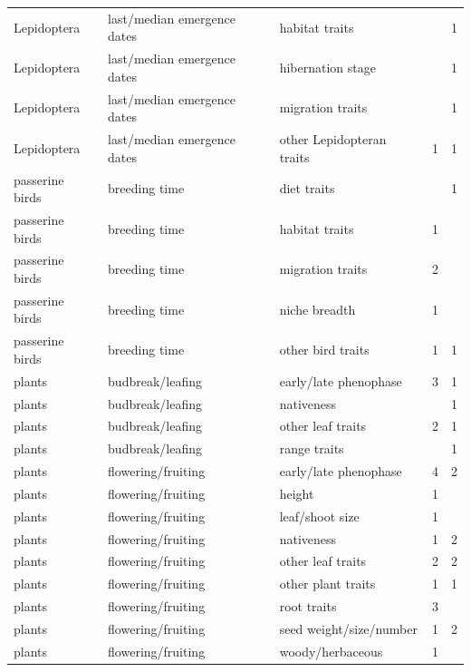 \documentclass[11pt,letter]{article}
\begin{document}
\begin{table}[ht]
\begin{tabular}{lllrr}
  Lepidoptera & last/median emergence dates & habitat traits &  &   1 \\ 
  Lepidoptera & last/median emergence dates & hibernation stage &  &   1 \\ 
  Lepidoptera & last/median emergence dates & migration traits &  &   1 \\ 
  Lepidoptera & last/median emergence dates & other Lepidopteran traits &   1 &   1 \\ 
  passerine birds & breeding time & diet traits &  &   1 \\ 
  passerine birds & breeding time & habitat traits &   1 &  \\ 
  passerine birds & breeding time & migration traits &   2 &  \\ 
  passerine birds & breeding time & niche breadth &   1 &  \\ 
  passerine birds & breeding time & other bird traits &   1 &   1 \\ 
  plants & budbreak/leafing & early/late phenophase &   3 &   1 \\ 
  plants & budbreak/leafing & nativeness &  &   1 \\ 
  plants & budbreak/leafing & other leaf traits &   2 &   1 \\ 
  plants & budbreak/leafing & range traits &  &   1 \\ 
  plants & flowering/fruiting & early/late phenophase &   4 &   2 \\ 
  plants & flowering/fruiting & height &   1 &  \\ 
  plants & flowering/fruiting & leaf/shoot size &   1 &  \\ 
  plants & flowering/fruiting & nativeness &   1 &   2 \\ 
  plants & flowering/fruiting & other leaf traits &   2 &   2 \\ 
  plants & flowering/fruiting & other plant traits &   1 &   1 \\ 
  plants & flowering/fruiting & root traits &   3 &  \\ 
  plants & flowering/fruiting & seed weight/size/number &   1 &   2 \\ 
  plants & flowering/fruiting & woody/herbaceous &   1 &  \\ 
   \hline
\end{tabular}
\endgroup
\end{table}
\end{document}
